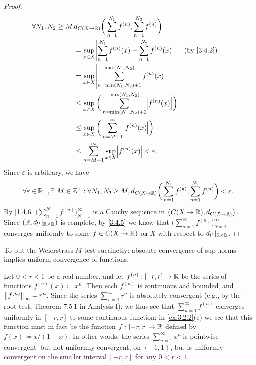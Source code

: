 \begin{proof}
  \begin{align*}
    \forall N_1, N_2 \geq M, & d_{C(X \to \R)}\bigg(\sum_{n = 1}^{N_1} f^{(n)}, \sum_{n = 1}^{N_2} f^{(n)}\bigg)                               \\
                             & = \sup_{x \in X} \abs{\sum_{n = 1}^{N_1} f^{(n)}(x) - \sum_{n = 1}^{N_2} f^{(n)}(x)}            &  & \by{3.4.2} \\
                             & = \sup_{x \in X} \abs{\sum_{n = \min(N_1, N_2) + 1}^{\max(N_1, N_2)} f^{(n)}(x)}                                \\
                             & \leq \sup_{x \in X} \bigg(\sum_{n = \min(N_1, N_2) + 1}^{\max(N_1, N_2)} \abs{f^{(n)}(x)}\bigg)                 \\
                             & \leq \sup_{x \in X} \bigg(\sum_{n = M + 1}^\infty \abs{f^{(n)}(x)}\bigg)                                        \\
                             & \leq \sum_{n = M + 1}^\infty \sup_{x \in X} \abs{f^{(n)}(x)} < \varepsilon.
  \end{align*}
  Since \(\varepsilon\) is arbitrary, we have
  \[
    \forall \varepsilon \in \R^+, \exists\ M \in \Z^+ : \forall N_1, N_2 \geq M, d_{C(X \to \R)}\bigg(\sum_{n = 1}^{N_1} f^{(n)}, \sum_{n = 1}^{N_2} f^{(n)}\bigg) < \varepsilon.
  \]
  By \cref{1.4.6} \(\bigg(\sum_{n = 1}^N f^{(n)}\bigg)_{N = 1}^\infty\) is a Cauchy sequence in \(\big(C(X \to \R), d_{C(X \to \R)}\big)\).
  Since \((\R, d_{l^1}|_{\R \times \R})\) is complete, by \cref{3.4.5} we know that \(\bigg(\sum_{n = 1}^N f^{(n)}\bigg)_{N = 1}^\infty\) converges uniformly to some \(f \in C(X \to \R)\) on \(X\) with respect to \(d_{l^1}|_{\R \times \R}\).
\end{proof}

\begin{note}
  To put the Weierstrass \(M\)-test succinctly:
  absolute convergence of sup norms implies uniform convergence of functions.
\end{note}

\begin{eg}\label{3.5.8}
  Let \(0 < r < 1\) be a real number, and let \(f^{(n)} : [-r, r] \to \R\) be the series of functions \(f^{(n)}(x) \coloneqq x^n\).
  Then each \(f^{(n)}\) is continuous and bounded, and \(\norm*{f^{(n)}}_\infty = r^n\).
  Since the series \(\sum_{n = 1}^\infty r^n\) is absolutely convergent (e.g., by the root test, Theorem 7.5.1 in Analysis I), we thus see that \(\sum_{n = 1}^\infty f^{(n)}\) converges uniformly in \([-r, r]\) to some continuous function;
  in \cref{ex:3.2.2}(c) we see that this function must in fact be the function \(f : [-r, r] \to \R\) defined by \(f(x) \coloneqq x / (1 - x)\).
  In other words, the series \(\sum_{n = 1}^\infty x^n\) is pointwise convergent, but not uniformly convergent, on \((-1, 1)\), but is uniformly convergent on the smaller interval \([-r, r]\) for any \(0 < r < 1\).
\end{eg}

